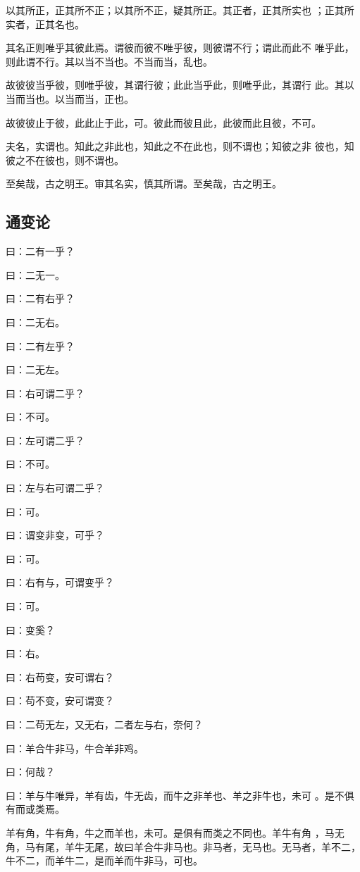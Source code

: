 \documentclass[]{article}
\begin{document}
以其所正，正其所不正；以其所不正，疑其所正。其正者，正其所实也
；正其所实者，正其名也。

其名正则唯乎其彼此焉。谓彼而彼不唯乎彼，则彼谓不行；谓此而此不
唯乎此，则此谓不行。其以当不当也。不当而当，乱也。

故彼彼当乎彼，则唯乎彼，其谓行彼；此此当乎此，则唯乎此，其谓行
此。其以当而当也。以当而当，正也。

故彼彼止于彼，此此止于此，可。彼此而彼且此，此彼而此且彼，不可。

夫名，实谓也。知此之非此也，知此之不在此也，则不谓也；知彼之非
彼也，知彼之不在彼也，则不谓也。

至矣哉，古之明王。审其名实，慎其所谓。至矣哉，古之明王。

\hypertarget{header-n16}{%
\subsection{通变论}\label{header-n16}}

曰：二有一乎？

曰：二无一。

曰：二有右乎？

曰：二无右。

曰：二有左乎？

曰：二无左。

曰：右可谓二乎？

曰：不可。

曰：左可谓二乎？

曰：不可。

曰：左与右可谓二乎？

曰：可。

曰：谓变非变，可乎？

曰：可。

曰：右有与，可谓变乎？

曰：可。

曰：变奚？

曰：右。

曰：右苟变，安可谓右？

曰：苟不变，安可谓变？

曰：二苟无左，又无右，二者左与右，奈何？

曰：羊合牛非马，牛合羊非鸡。

曰：何哉？

曰：羊与牛唯异，羊有齿，牛无齿，而牛之非羊也、羊之非牛也，未可
。是不俱有而或类焉。

羊有角，牛有角，牛之而羊也，未可。是俱有而类之不同也。羊牛有角
，马无角，马有尾，羊牛无尾，故曰羊合牛非马也。非马者，无马也。无马者，羊不二，牛不二，而羊牛二，是而羊而牛非马，可也。
\end{document}

